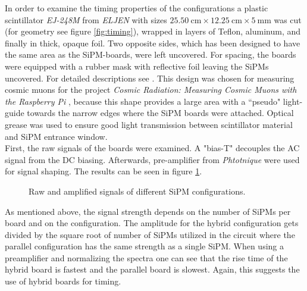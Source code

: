 \documentclass[%
 reprint,
 amsmath,amssymb,
 aps,
]{revtex4-1}
\newcommand{\tit}[1]{\textit{#1}}
\begin{document}
In order to examine the timing properties of the configurations a plastic scintillator \tit{EJ-248M} from \tit{ELJEN} with sizes $\SI{25.50}{\centi\meter}\times\SI{12.25}{\centi\meter}\times\SI{5}{\milli\meter}$ was cut (for geometry see figure \ref{fig:timing}), wrapped in layers of Teflon, aluminum, and finally in thick, opaque foil. Two opposite sides, which has been designed to have the same area as the SiPM-boards, were left uncovered. For spacing, the boards were equipped with a rubber mask with reflective foil leaving the SiPMs uncovered. For detailed descriptions see \cite{Lukas_Thesis}. This design was chosen for measuring cosmic muons for the project \tit{Cosmic Radiation: Measuring Cosmic Muons with the Raspberry Pi} \cite{schauer_projekt}, because this shape provides a large area with a ``pseudo" light-guide towards the narrow edges where the SiPM boards were attached. Optical grease was used to ensure good light transmission between scintillator material and SiPM entrance window. \\ \indent 
First, the raw signals of the boards were examined. A "bias-T" \cite{Lukas_Thesis} decouples the AC signal from the DC biasing. Afterwards, pre-amplifier from \tit{Phtotnique} \cite{photonique} were used for signal shaping. The results can be seen in figure \ref{fig:signals}. \\ \indent
\begin{figure}[t!]
	\hfill
	\hfill
	\caption{Raw and amplified signals of different SiPM configurations.}
	\label{fig:signals}
\end{figure}
As mentioned above, the signal strength depends on the number of SiPMs per board and on the configuration. The amplitude for the hybrid configuration gets divided by the square root of number of SiPMs utilized in the circuit where the parallel configuration has the same strength as a single SiPM. When using a preamplifier and normalizing the spectra one can see that the rise time of the hybrid board is fastest and the parallel board is slowest. Again, this suggests the use of hybrid boards for timing. \\ \indent
\end{document}
